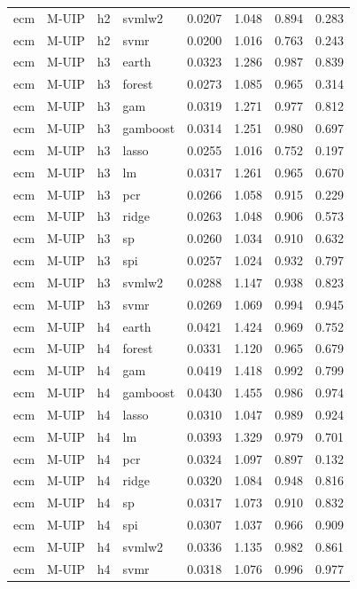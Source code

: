 \begin{ThreePartTable}
\begin{longtable}[t]{llclcccc}
ecm & M-UIP & h2 & svmlw2 & 0.0207 & 1.048 & 0.894 & 0.283\\
ecm & M-UIP & h2 & svmr & 0.0200 & 1.016 & 0.763 & 0.243\\
\addlinespace
ecm & M-UIP & h3 & earth & 0.0323 & 1.286 & 0.987 & 0.839\\
ecm & M-UIP & h3 & forest & 0.0273 & 1.085 & 0.965 & 0.314\\
ecm & M-UIP & h3 & gam & 0.0319 & 1.271 & 0.977 & 0.812\\
ecm & M-UIP & h3 & gamboost & 0.0314 & 1.251 & 0.980 & 0.697\\
ecm & M-UIP & h3 & lasso & 0.0255 & 1.016 & 0.752 & 0.197\\
ecm & M-UIP & h3 & lm & 0.0317 & 1.261 & 0.965 & 0.670\\
ecm & M-UIP & h3 & pcr & 0.0266 & 1.058 & 0.915 & 0.229\\
ecm & M-UIP & h3 & ridge & 0.0263 & 1.048 & 0.906 & 0.573\\
ecm & M-UIP & h3 & sp & 0.0260 & 1.034 & 0.910 & 0.632\\
ecm & M-UIP & h3 & spi & 0.0257 & 1.024 & 0.932 & 0.797\\
ecm & M-UIP & h3 & svmlw2 & 0.0288 & 1.147 & 0.938 & 0.823\\
ecm & M-UIP & h3 & svmr & 0.0269 & 1.069 & 0.994 & 0.945\\
\addlinespace
ecm & M-UIP & h4 & earth & 0.0421 & 1.424 & 0.969 & 0.752\\
ecm & M-UIP & h4 & forest & 0.0331 & 1.120 & 0.965 & 0.679\\
ecm & M-UIP & h4 & gam & 0.0419 & 1.418 & 0.992 & 0.799\\
ecm & M-UIP & h4 & gamboost & 0.0430 & 1.455 & 0.986 & 0.974\\
ecm & M-UIP & h4 & lasso & 0.0310 & 1.047 & 0.989 & 0.924\\
ecm & M-UIP & h4 & lm & 0.0393 & 1.329 & 0.979 & 0.701\\
ecm & M-UIP & h4 & pcr & 0.0324 & 1.097 & 0.897 & 0.132\\
ecm & M-UIP & h4 & ridge & 0.0320 & 1.084 & 0.948 & 0.816\\
ecm & M-UIP & h4 & sp & 0.0317 & 1.073 & 0.910 & 0.832\\
ecm & M-UIP & h4 & spi & 0.0307 & 1.037 & 0.966 & 0.909\\
ecm & M-UIP & h4 & svmlw2 & 0.0336 & 1.135 & 0.982 & 0.861\\
ecm & M-UIP & h4 & svmr & 0.0318 & 1.076 & 0.996 & 0.977\\

\end{longtable}
\end{ThreePartTable}
